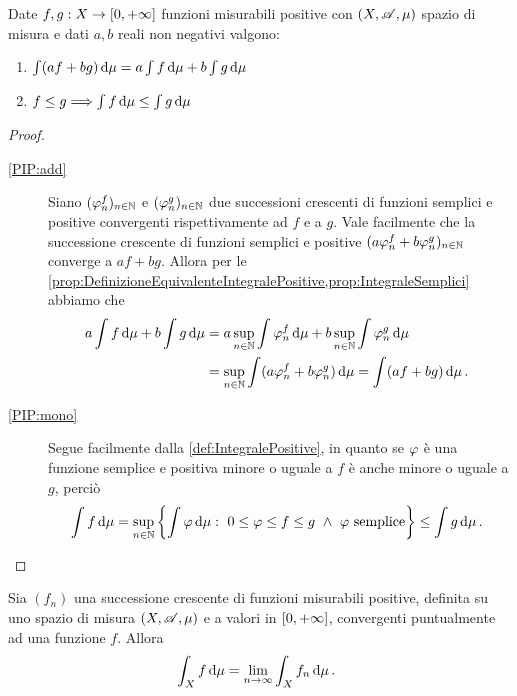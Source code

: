 \begin{proposition}\label{prop:IntegralePositive}
	Date $f,g:X\to[0,+\infty]$ funzioni misurabili positive con $(X,\mathscr A,\mu)$ spazio di misura e dati $a,b$ reali non negativi valgono:
	\begin{enumerate}
		\item $\int (af+bg)\,\mathrm d\mu=a\int f\,\mathrm d\mu+b\int g\,\mathrm d\mu$ \label{PIP:add}
		\item $f\le g\Longrightarrow \int f\,\mathrm d\mu\le \int g\,\mathrm d\mu$ \label{PIP:mono}
	\end{enumerate}
\end{proposition}
\begin{proof}
	\begin{description}
		\item[\ref{PIP:add}] Siano $(\varphi_n^f)_{n\in\mathbb N}$ e $(\varphi_n^g)_{n\in\mathbb N}$ due successioni crescenti di funzioni semplici e positive convergenti rispettivamente ad $f$ e a $g$. Vale facilmente che la successione crescente di funzioni semplici e positive $(a\varphi_n^f+b\varphi_n^g)_{n\in\mathbb N}$ converge a $af+bg$. Allora per le \cref{prop:DefinizioneEquivalenteIntegralePositive,prop:IntegraleSemplici} abbiamo che
		\begin{equation*}
		\begin{split}
			a\int f\,\mathrm d\mu+b\int g\,\mathrm d\mu&=a\sup_{n\in\mathbb N}\int \varphi_n^f\,\mathrm d\mu+b\sup_{n\in\mathbb N}\int \varphi_n^g\,\mathrm d\mu \\
			&=\sup_{n\in\mathbb N}\int (a\varphi_n^f+b\varphi_n^g)\,\mathrm d\mu=\int (af+bg)\,\mathrm d\mu\, \text{. }
		\end{split}
		\end{equation*}
		
		\item[\ref{PIP:mono}] Segue facilmente dalla \cref{def:IntegralePositive}, in quanto se $\varphi$ è una funzione semplice e positiva minore o uguale a $f$ è anche minore o uguale a $g$, perciò
		\begin{equation*}
		\int f\de\mu=\sup_{n\in\N}\left\{\int\simp\de \mu:\ 0\le \simp\le f\le g\ \wedge\ \simp \text{ semplice}\right\}\le \int g\de\mu\punto
	\end{equation*}
	\end{description}
\end{proof}

\begin{theorem}\label{thm:BeppoLevi}
	Sia $(f_n)$ una successione crescente di funzioni misurabili positive, definita su uno spazio di misura $(X,\mathscr A,\mu)$ e a valori in $[0,+\infty]$, convergenti puntualmente ad una funzione $f$. Allora 
	\begin{equation*}
	\int_Xf\,\mathrm d\mu=\lim_{n\to\infty}\int_Xf_n\,\mathrm d\mu\, \text{. }
	\end{equation*}
\end{theorem}

